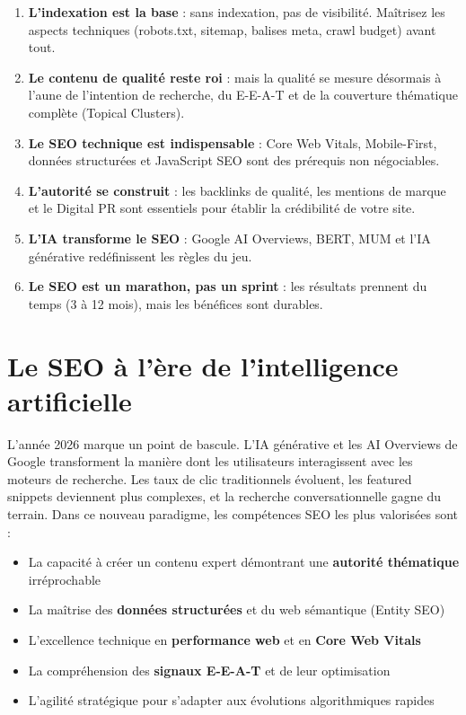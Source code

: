 \documentclass[12pt,a4paper,twoside]{report}
\newcommand{\keyword}[1]{\textbf{\textcolor{googleblue}{#1}}}
\begin{document}
\begin{enumerate}
    \item \textbf{L'indexation est la base} : sans indexation, pas de visibilité. Maîtrisez les aspects techniques (robots.txt, sitemap, balises meta, crawl budget) avant tout.
    \item \textbf{Le contenu de qualité reste roi} : mais la qualité se mesure désormais à l'aune de l'intention de recherche, du E-E-A-T et de la couverture thématique complète (Topical Clusters).
    \item \textbf{Le SEO technique est indispensable} : Core Web Vitals, Mobile-First, données structurées et JavaScript SEO sont des prérequis non négociables.
    \item \textbf{L'autorité se construit} : les backlinks de qualité, les mentions de marque et le Digital PR sont essentiels pour établir la crédibilité de votre site.
    \item \textbf{L'IA transforme le SEO} : Google AI Overviews, BERT, MUM et l'IA générative redéfinissent les règles du jeu.
    \item \textbf{Le SEO est un marathon, pas un sprint} : les résultats prennent du temps (3 à 12 mois), mais les bénéfices sont durables.
\end{enumerate}

\section*{Le SEO à l'ère de l'intelligence artificielle}

L'année 2026 marque un point de bascule. L'IA générative et les AI Overviews de Google transforment la manière dont les utilisateurs interagissent avec les moteurs de recherche. Les taux de clic traditionnels évoluent, les featured snippets deviennent plus complexes, et la recherche conversationnelle gagne du terrain. Dans ce nouveau paradigme, les compétences SEO les plus valorisées sont :

\begin{itemize}
    \item La capacité à créer un contenu expert démontrant une \keyword{autorité thématique} irréprochable
    \item La maîtrise des \keyword{données structurées} et du web sémantique (Entity SEO)
    \item L'excellence technique en \keyword{performance web} et en \keyword{Core Web Vitals}
    \item La compréhension des \keyword{signaux E-E-A-T} et de leur optimisation
    \item L'agilité stratégique pour s'adapter aux évolutions algorithmiques rapides
\end{itemize}
\end{document}
